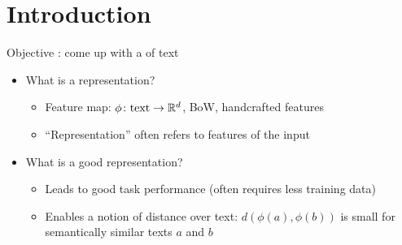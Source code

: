 \documentclass[usenames,dvipsnames,notes,11pt,aspectratio=169]{beamer}
\begin{document}

\section{Introduction}

\begin{frame}
    {Objective}    
    : come up with a  of text\\
    \begin{itemize}
        \item What is a representation?
            \begin{itemize}
                \item Feature map: $\phi\colon \text{text} \rightarrow \mathbb{R}^d$, \eg BoW, handcrafted features
                \item ``Representation'' often refers to  features of the input
            \end{itemize}
            \pause
        \item What is a good representation?
            \pause
            \begin{itemize}
                \item Leads to good task performance (often requires less training data)
                \item Enables a notion of distance over text: 
                    $d(\phi(a), \phi(b))$ is small for semantically similar texts $a$ and $b$
            \end{itemize}
    \end{itemize}
\end{frame}
\end{document}
